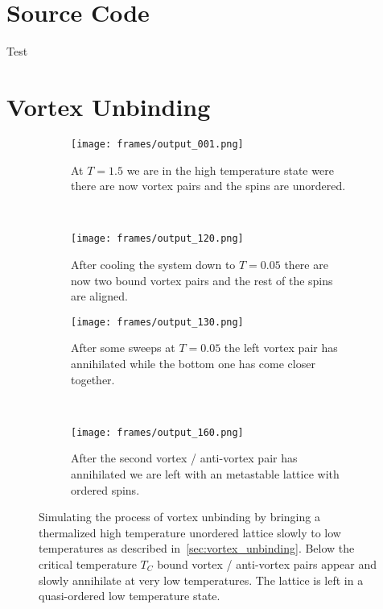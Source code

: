 \section{Source Code}\label{app:source_code}
Test

\section{Vortex Unbinding}\label{app:vortex_unbinding}
\begin{figure}[H]
	\centering
	\begin{subfigure}[h]{0.45\textwidth}
		\centering
		\texttt{[image: frames/output\_001.png]}
		\caption{At $T=\num{1.5}$ we are in the high temperature state were there are now vortex pairs and the spins are unordered.}
	\end{subfigure}
	~
	\begin{subfigure}[h]{0.45\textwidth}
		\centering
		\texttt{[image: frames/output\_120.png]}
		\caption{After cooling the system down to $T=\num{0.05}$ there are now two bound vortex pairs and the rest of the spins are aligned.}
	\end{subfigure}
	\begin{subfigure}[h]{0.45\textwidth}
		\centering
		\texttt{[image: frames/output\_130.png]}
		\caption{After some sweeps at $T=\num{0.05}$ the left vortex pair has annihilated while the bottom one has come closer together.}
	\end{subfigure}
	~
	\begin{subfigure}[h]{0.45\textwidth}
		\centering
		\texttt{[image: frames/output\_160.png]}
		\caption{After the second vortex / anti-vortex pair has annihilated we are left with an metastable lattice with ordered spins.}
	\end{subfigure}
	\caption[Vortex unbiding of vortex / antivortex pairs at low temperatures.]{Simulating the process of vortex unbinding by bringing a thermalized high temperature unordered lattice slowly to low temperatures as described in~\cref{sec:vortex_unbinding}. Below the critical temperature $T_C$ bound vortex / anti-vortex pairs appear and slowly annihilate at very low temperatures. The lattice is left in a quasi-ordered low temperature state.}
	\label{fig:vortex_unbinding}
\end{figure}
